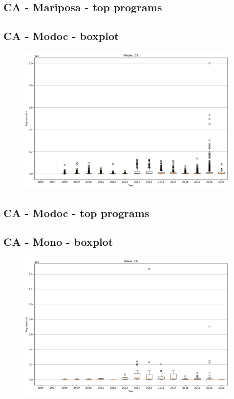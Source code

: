 \subsection*{CA - Mariposa - top programs}

\newpage
\subsection*{CA - Modoc - boxplot}
\begin{figure}[h]
\centering
\includegraphics[width=7in]{../output/boxplots/counties/Modoc-CA_boxplot.png}
\end{figure}


\subsection*{CA - Modoc - top programs}

\newpage
\subsection*{CA - Mono - boxplot}
\begin{figure}[h]
\centering
\includegraphics[width=7in]{../output/boxplots/counties/Mono-CA_boxplot.png}
\end{figure}


